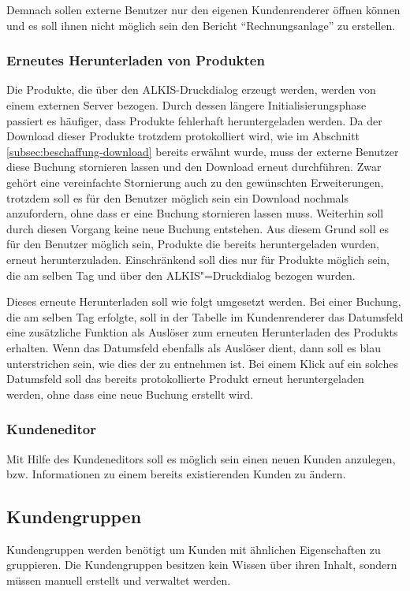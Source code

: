 Demnach sollen externe Benutzer nur den eigenen Kundenrenderer öffnen können und es soll ihnen nicht möglich sein den Bericht \enquote{Rechnungsanlage} zu erstellen.

\subsubsection{Erneutes Herunterladen von Produkten}
Die Produkte, die über den ALKIS-Druckdialog erzeugt werden, werden von einem externen Server bezogen.
Durch dessen längere Initialisierungsphase passiert es häufiger, dass Produkte fehlerhaft heruntergeladen werden.
Da der Download dieser Produkte trotzdem protokolliert wird, wie im Abschnitt \vref{subsec:beschaffung-download} bereits erwähnt wurde, muss der externe Benutzer diese Buchung stornieren lassen und den Download erneut durchführen.
Zwar gehört eine vereinfachte Stornierung auch zu den gewünschten Erweiterungen, trotzdem soll es für den Benutzer möglich sein ein Download nochmals anzufordern, ohne dass er eine Buchung stornieren lassen muss.
Weiterhin soll durch diesen Vorgang keine neue Buchung entstehen.
Aus diesem Grund soll es für den Benutzer möglich sein, Produkte die bereits heruntergeladen wurden, erneut herunterzuladen. Einschränkend soll dies nur für Produkte möglich sein, die am selben Tag und über den ALKIS"=Druckdialog bezogen wurden. 

Dieses erneute Herunterladen soll wie folgt umgesetzt werden. Bei einer Buchung, die am selben Tag erfolgte, soll in der Tabelle im Kundenrenderer das Datumsfeld eine zusätzliche Funktion als Auslöser zum erneuten Herunterladen des Produkts erhalten.
Wenn das Datumsfeld ebenfalls als Auslöser dient, dann soll es blau unterstrichen sein, wie dies der  zu entnehmen ist.
Bei einem Klick auf ein solches Datumsfeld soll das bereits protokollierte Produkt erneut heruntergeladen werden, ohne dass eine neue Buchung erstellt wird.

\subsubsection{Kundeneditor}
Mit Hilfe des Kundeneditors soll es möglich sein einen neuen Kunden anzulegen, bzw. Informationen zu einem bereits existierenden Kunden zu ändern.

\subsection{Kundengruppen}
Kundengruppen werden benötigt um Kunden mit ähnlichen Eigenschaften zu gruppieren.
Die Kundengruppen besitzen kein Wissen über ihren Inhalt, sondern müssen manuell erstellt und verwaltet werden.

